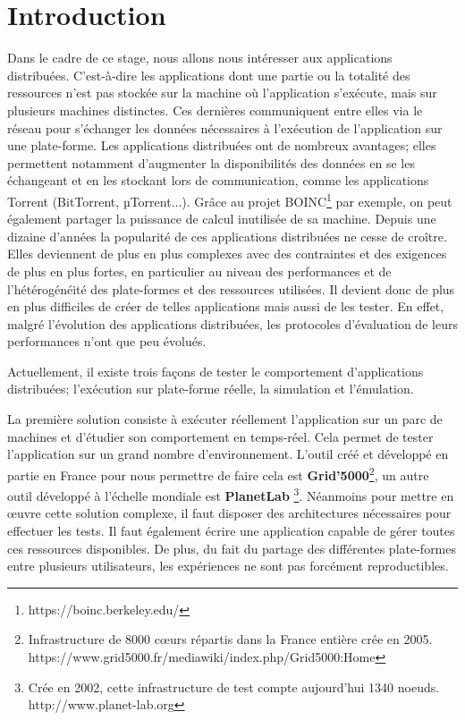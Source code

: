 \section{Introduction}



Dans le cadre de ce stage, nous allons nous intéresser aux applications distribuées. C'est-à-dire les applications dont une partie ou la totalité des ressources  n'est pas stockée sur la machine où l'application s'exécute, mais sur plusieurs machines distinctes. Ces dernières communiquent entre elles via le réseau pour s'échanger les données nécessaires à l'exécution de l'application sur une plate-forme. Les applications distribuées ont de nombreux avantages; elles permettent notamment d'augmenter la disponibilités des données en se les échangeant et en les stockant lors de communication, comme les applications Torrent (BitTorrent, $µ$Torrent...). Grâce au projet BOINC\footnote{https://boinc.berkeley.edu/} par exemple, on peut également partager la puissance de calcul inutilisée de sa machine. Depuis une dizaine d'années la popularité de ces applications distribuées ne cesse de croître. Elles deviennent de plus en plus complexes avec des contraintes et des exigences de plus en plus fortes, en particulier au niveau des performances et de l'hétérogénéité des plate-formes et des ressources utilisées. Il devient donc de plus en plus difficiles de créer de telles applications mais aussi de les tester. En effet, malgré l'évolution des applications distribuées, les protocoles d'évaluation de leurs performances n'ont que peu évolués.

Actuellement, il existe trois façons de tester le comportement d'applications distribuées; l'exécution sur plate-forme réelle, la simulation et l'émulation. 

La première solution consiste à exécuter réellement l'application sur un parc de machines et d'étudier son comportement en temps-réel. Cela permet de tester l'application sur un grand nombre d'environnement. L'outil créé et développé en partie en France pour nous permettre de faire cela est \textbf{Grid'5000}\footnote{Infrastructure de 8000 c\oe urs répartis dans la France entière crée en 2005. \\ https://www.grid5000.fr/mediawiki/index.php/Grid5000:Home}\cite{GRID5000}, un autre outil développé à l'échelle mondiale est \textbf{PlanetLab} \footnote{Crée en 2002, cette infrastructure de test compte aujourd'hui 1340 noeuds. \\ http://www.planet-lab.org}. Néanmoins pour mettre en \oe uvre cette solution complexe, il faut disposer des architectures nécessaires pour effectuer les tests. Il faut également écrire une application capable de gérer toutes ces ressources disponibles. De plus, du fait du partage des différentes plate-formes entre plusieurs utilisateurs, les expériences ne sont pas forcément reproductibles. 

